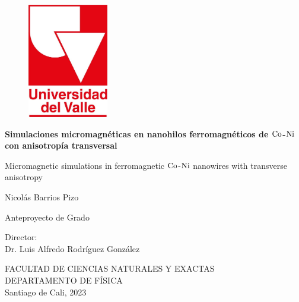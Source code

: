 \begin{titlepage}
\thispagestyle{empty}

\begin{center}
\begin{figure}[!htp]
    \centering
    \includegraphics[height=5cm]{Main/logoUV_Oficial_Rojo.jpg}
\end{figure}

\vspace*{0.2in}

\begin{Large}
\textbf{Simulaciones micromagnéticas en nanohilos ferromagnéticos de $\ce{Co}$-$\ce{Ni}$ con anisotropía transversal}\\
\end{Large}

\vspace*{0.2 in}

\begin{Large}
Micromagnetic simulations in ferromagnetic $\ce{Co}$-$\ce{Ni}$ nanowires with transverse anisotropy
\end{Large}

\vspace*{0.8in}
\begin{large}
Nicolás Barrios Pizo \\
\end{large}
\vspace*{0.8in}
\begin{large}
Anteproyecto de Grado\\
\end{large}
\vspace*{1 in}
\vspace*{0 in}
\begin{large}
Director:\\
Dr. Luis Alfredo Rodríguez González
\end{large}

\vspace*{1.5 in}
FACULTAD DE CIENCIAS NATURALES Y EXACTAS\\
\vspace*{0.1in}
DEPARTAMENTO DE FÍSICA \\
\vspace*{0.1in}
Santiago de Cali, 2023

\end{center}

\end{titlepage}